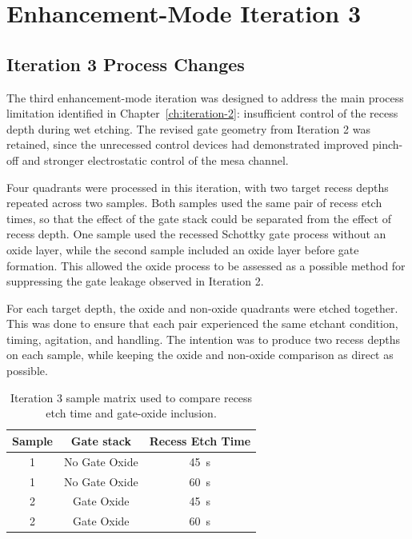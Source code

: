 \chapter{Enhancement-Mode Iteration 3}
\label{ch:iteration-3}

\section{Iteration 3 Process Changes}

The third enhancement-mode iteration was designed to address the main process
limitation identified in Chapter~\ref{ch:iteration-2}: insufficient control of
the recess depth during wet etching. The revised gate geometry from Iteration 2
was retained, since the unrecessed control devices had demonstrated improved
pinch-off and stronger electrostatic control of the mesa channel.

\vspace{1mm}

Four quadrants were processed in this iteration, with two target
recess depths repeated across two samples. Both samples used the same pair of recess
etch times, so that the effect of the gate stack could be separated from the
effect of recess depth. One sample used the recessed Schottky gate process
without an oxide layer, while the second sample included an oxide layer before
gate formation. This allowed the oxide process to be assessed as a possible
method for suppressing the gate leakage observed in Iteration 2.

\vspace{1mm}

For each target depth, the oxide and non-oxide quadrants were etched together.
This was done to ensure that each pair experienced the same etchant condition,
timing, agitation, and handling. The intention was to produce two recess depths
on each sample, while keeping the oxide and non-oxide comparison as direct as
possible.

\begin{table}[htbp]
  \centering
  \caption{Iteration 3 sample matrix used to compare recess etch time and
  gate-oxide inclusion.}
  \label{tab:iteration3-quadrants}
  \begin{tabular}{c c c}
    \hline
    Sample & Gate stack & Recess Etch Time \\
    \hline
    1 & No Gate Oxide & \SI{45}{\second} \\
    1 & No Gate Oxide & \SI{60}{\second} \\
    2 & Gate Oxide& \SI{45}{\second} \\
    2 & Gate Oxide & \SI{60}{\second} \\
    \hline
  \end{tabular}
\end{table}

